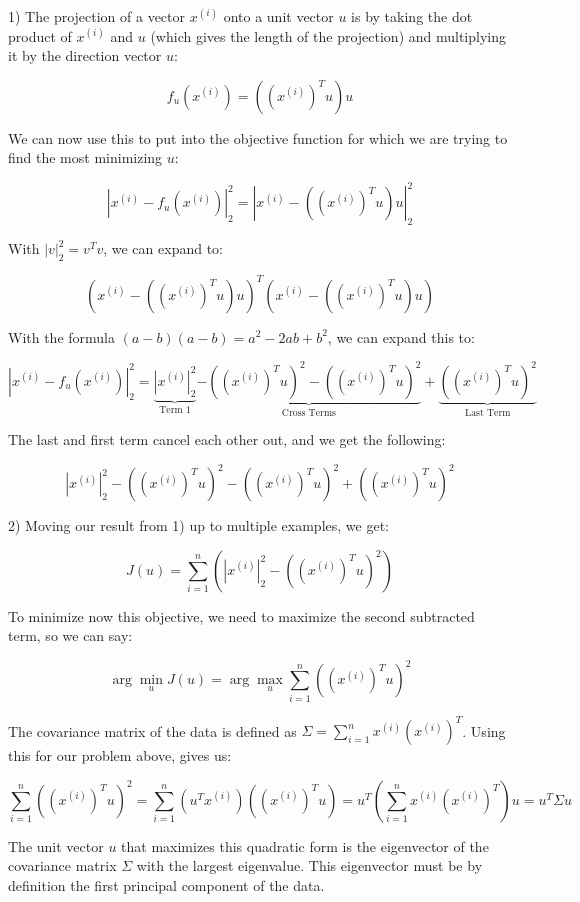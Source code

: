\begin{answer}

    1) The projection of a vector $x^{(i)}$ onto a unit vector $u$ is by taking the dot product of $x^{(i)}$ and $u$ (which gives the length of the projection) and multiplying it by the direction vector $u$:

    $$f_u(x^{(i)}) = ((x^{(i)})^T u) u$$
    
    We can now use this to put into the objective function for which we are trying to find the most minimizing $u$:
    
    $$|x^{(i)} - f_u(x^{(i)})|^2_2 = |x^{(i)} - ((x^{(i)})^T u) u|^2_2$$
    
    With $|v|^2_2 = v^T v$, we can expand to:
    
    $$\left( x^{(i)} - ((x^{(i)})^T u) u \right)^T \left( x^{(i)} - ((x^{(i)})^T u) u \right)$$
    
    With the formula $(a-b)(a-b) = a^2 - 2ab + b^2$, we can expand this to:
    
    $$|x^{(i)} - f_u(x^{(i)})|^2_2 = \underbrace{|x^{(i)}|^2_2}_{\text{Term 1}} \underbrace{- ((x^{(i)})^T u)^2 - ((x^{(i)})^T u)^2}_{\text{Cross Terms}} + \underbrace{((x^{(i)})^T u)^2}_{\text{Last Term}}$$
    
    The last and first term cancel each other out, and we get the following:
    
    $$|x^{(i)}|^2_2 - ((x^{(i)})^T u)^2 - ((x^{(i)})^T u)^2 + ((x^{(i)})^T u)^2$$
    
    
    2) Moving our result from 1) up to multiple examples, we get:
    
    $$J(u) = \sum_{i=1}^{n} \left( |x^{(i)}|^2_2 - ((x^{(i)})^T u)^2 \right)$$
    
    To minimize now this objective, we need to maximize the second subtracted term, so we can say:
    
    $$\arg\min_{u} J(u) = \arg\max_{u} \sum_{i=1}^{n} ((x^{(i)})^T u)^2$$
    
    The covariance matrix of the data is defined as $\Sigma = \sum_{i=1}^{n} x^{(i)}(x^{(i)})^T$. Using this for our problem above, gives us:
    
    $$\sum_{i=1}^{n} ((x^{(i)})^T u)^2 = \sum_{i=1}^{n} (u^T x^{(i)}) ( (x^{(i)})^T u) = u^T \left( \sum_{i=1}^{n} x^{(i)}(x^{(i)})^T \right) u = u^T \Sigma u$$
    
    The unit vector $u$ that maximizes this quadratic form is the eigenvector of the covariance matrix $\Sigma$ with the largest eigenvalue. This eigenvector must be by definition the first principal component of the data.

\end{answer}
